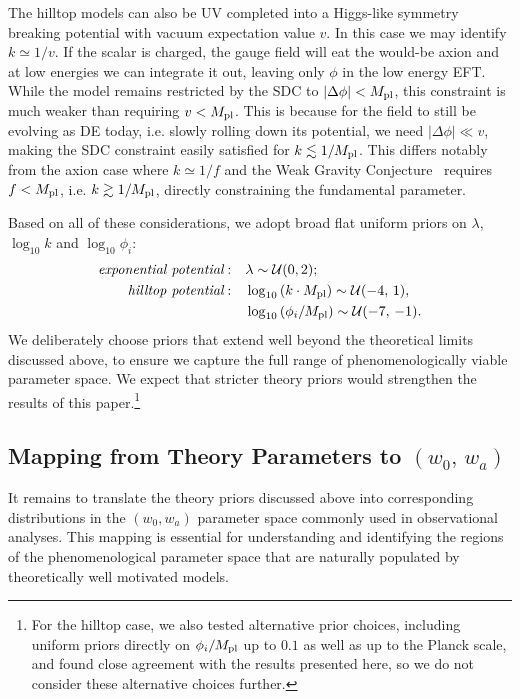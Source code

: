 The hilltop models can also be UV completed into a Higgs-like symmetry breaking potential with vacuum expectation value $v$. In this case we may identify $k\simeq 1/v$.  If the scalar is charged, the gauge field will eat the would-be axion and at low energies we can integrate it out, leaving only $\phi$ in the low energy EFT. While the model remains restricted by the SDC to $|\Delta \phi| < M_{\mathrm{pl}}$, this constraint is much weaker than requiring $v< M_{\mathrm{pl}}$. This is because for the field to still be evolving as DE today, i.e. slowly rolling down its potential,  we need $|\Delta \phi|\ll v$, making the SDC constraint easily satisfied for $k\lesssim 1/M_{\mathrm{pl}}$. This differs notably from the axion case where $k\simeq 1/f$ and the Weak Gravity Conjecture~\cite{Arkani-Hamed:2006emk, Harlow:2022ich} requires $f < M_{\mathrm{pl}}$, i.e. $k\gtrsim 1/M_{\mathrm{pl}}$, directly constraining the fundamental parameter.

Based on all of these considerations, we adopt broad flat uniform priors on $\lambda$, $\log_{10} k$ and $\log_{10}\phi_i$:
\begin{align}
    {\text{\it exponential potential}}:\quad &\lambda\sim\mathcal{U}(0,2); \label{eq:ch11-Prior_exp}\\
    {\text{\it hilltop potential}}: \quad &\log_{10}\left(k\cdot {M_{\mathrm{pl}}}\right)\sim \mathcal{U}(-4,\,1),\nonumber \\
    &\log_{10}\left(\phi_i/M_{\mathrm{pl}}\right)\sim \mathcal{U}(-7,\,-1). \label{eq:ch11-Prior_hilltop}
\end{align}
We deliberately choose priors that extend well beyond the theoretical limits discussed above, to ensure
we capture the full range of phenomenologically viable parameter space. We expect that stricter theory priors would strengthen the results of this paper.\footnote{For the hilltop case, we also tested alternative prior choices, including uniform priors directly on $\phi_i/M_{\mathrm{pl}}$ up to $0.1$ as well as up to the Planck scale, and found close agreement with the results presented here, so we do not consider these alternative choices further.}

\subsection{Mapping from Theory Parameters to $(w_0,\,w_a)$}
\label{subsec:ch11-mapping}

\noindent
It remains to translate the theory priors discussed above into corresponding distributions in the $(w_0,w_a)$ parameter space commonly used in observational analyses. This mapping is essential for understanding and identifying the
regions of the phenomenological parameter space that are naturally populated by theoretically well motivated models.

